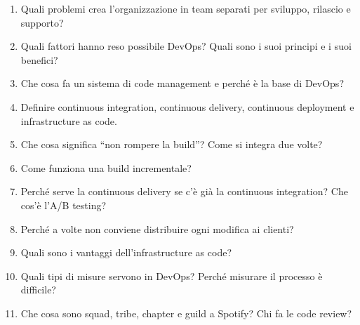 \begin{domande}
\begin{enumerate}
  \item Quali problemi crea l'organizzazione in team separati per sviluppo, rilascio e supporto?
  \item Quali fattori hanno reso possibile DevOps? Quali sono i suoi principi e i suoi benefici?
  \item Che cosa fa un sistema di code management e perché è la base di DevOps?
  \item Definire continuous integration, continuous delivery, continuous deployment e infrastructure as code.
  \item Che cosa significa ``non rompere la build''? Come si integra due volte?
  \item Come funziona una build incrementale?
  \item Perché serve la continuous delivery se c'è già la continuous integration? Che cos'è l'A/B testing?
  \item Perché a volte non conviene distribuire ogni modifica ai clienti?
  \item Quali sono i vantaggi dell'infrastructure as code?
  \item Quali tipi di misure servono in DevOps? Perché misurare il processo è difficile?
  \item Che cosa sono squad, tribe, chapter e guild a Spotify? Chi fa le code review?
\end{enumerate}
\end{domande}
